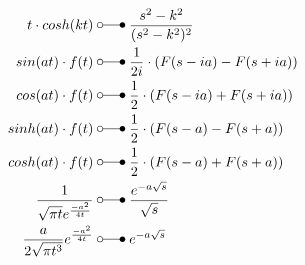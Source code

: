 \begin{align*}
    t\cdot cosh(kt)                       \;&\laplace\; \frac{s^2-k^2}{(s^2-k^2)^2}  \\
    sin(at)\cdot f(t)               \;&\laplace\; \frac{1}{2i}\cdot(F(s-ia)-F(s+ia)) \\
    cos(at)\cdot f(t)               \;&\laplace\; \frac{1}{2}\cdot(F(s-ia)+F(s+ia)) \\
    sinh(at)\cdot f(t)              \;&\laplace\; \frac{1}{2}\cdot(F(s-a)-F(s+a)) \\
    cosh(at)\cdot f(t)              \;&\laplace\; \frac{1}{2}\cdot(F(s-a)+F(s+a)) \\
    \frac{1}{\sqrt{\pi t}e^{\frac{-a^2}{4t}}} \;&\laplace\; \frac{e^{-a\sqrt{s}}}{\sqrt{s}} \\
    \frac{a}{2\sqrt{\pi t^3}}e^{\frac{-a^2}{4t}} \;&\laplace\; e^{-a\sqrt{s}}
\end{align*}
